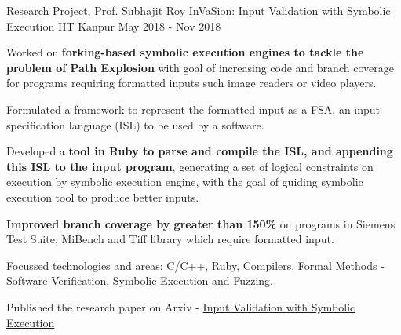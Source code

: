\begin{cventries}


  \cventry
    {Research Project, Prof. Subhajit Roy} %
    {\href{https://arxiv.org/abs/2104.01438}{InVaSion}: Input Validation with Symbolic Execution} %
    {IIT Kanpur} %
    {May 2018 - Nov 2018} %
    {
      \begin{cvitems} %
      \item {Worked on \textbf{forking-based symbolic execution engines to tackle the problem of Path Explosion} with goal of increasing code and branch coverage for programs requiring formatted inputs such image readers or video players.}
      \item {Formulated a framework to represent the formatted input as a FSA, an input specification language (ISL) to be used by a software.}
        \item {Developed a \textbf{tool in Ruby to parse and compile the ISL, and appending this ISL to the input program}, generating a set of logical constraints on execution by symbolic execution engine, with the goal of guiding symbolic execution tool to produce better inputs.}
        \item {\textbf{Improved branch coverage by greater than 150\%} on programs in Siemens Test Suite, MiBench and Tiff library which require formatted input.}
        \item {Focussed technologies and areas: C/C++, Ruby, Compilers, Formal Methods - Software Verification, Symbolic Execution and Fuzzing.}
        \item {Published the research paper on Arxiv - \href{https://arxiv.org/abs/2104.01438}{Input Validation with Symbolic Execution}}
      \end{cvitems}
    }%





\end{cventries}
